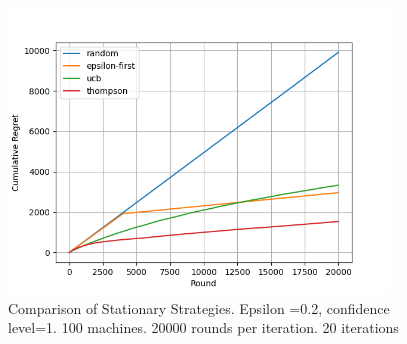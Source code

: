 \begin{figure}[!h]
    \centering
    \includegraphics[width=0.9\textwidth]{figures/100machines}
    \caption[Comparison for 100 machines]{Comparison of Stationary Strategies. Epsilon =0.2, confidence level=1. 100 machines. 20000 rounds per iteration. 20 iterations}
    \label{fig: all4}
\end{figure}